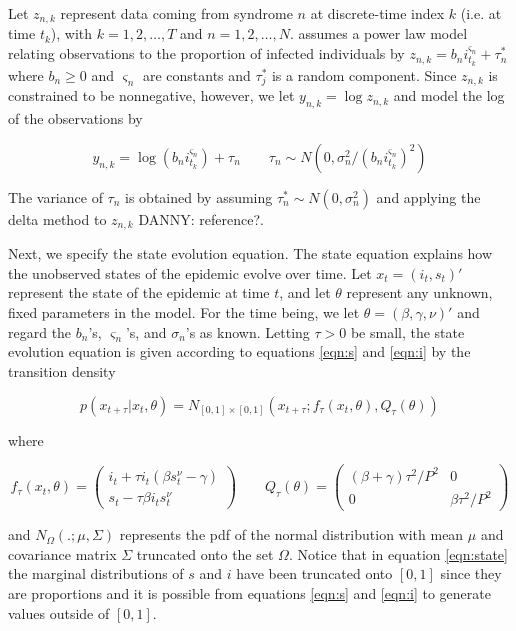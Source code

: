 \documentclass{article}
\newcommand{\danny}[1]{{\color{blue}DANNY: #1}}
\begin{document}
Let $z_{n,k}$ represent data coming from syndrome $n$ at discrete-time index $k$ (i.e. at time $t_k$), with $k = 1,2,\ldots,T$ and $n = 1,2,\ldots,N$.  \citet{skvortsov2012monitoring} assumes a power law model relating observations to the proportion of infected individuals by $z_{n,k} = b_ni_{t_k}^{\varsigma_n} + \tau^*_n$ where $b_n \ge 0$ and $\varsigma_n$ are constants and $\tau^*_j$ is a random component. Since $z_{n,k}$ is constrained to be nonnegative, however, we let $y_{n,k} = \log z_{n,k}$ and model the log of the observations by

\begin{equation}
y_{n,k} = \log \left(b_ni_{t_k}^{\varsigma_n}\right) + \tau_n \qquad \tau_n \sim N\left(0,\sigma_n^2 / (b_ni_{t_k}^{\varsigma_n})^2\right) \label{eqn:obs}
\end{equation}

\noindent The variance of $\tau_n$ is obtained by assuming $\tau^*_n \sim N(0,\sigma_n^2)$ and applying the delta method to $z_{n,k}$ \danny{reference?}.

Next, we specify the state evolution equation.  The state equation explains how the unobserved states of the epidemic evolve over time.  Let $x_t = (i_t,s_t)'$ represent the state of the epidemic at time $t$, and let $\theta$ represent any unknown, fixed parameters in the model.  For the time being, we let $\theta = (\beta, \gamma, \nu)'$ and regard the $b_n$'s, $\varsigma_n$'s, and $\sigma_n$'s as known.  Letting $\tau > 0$ be small, the state evolution equation is given according to equations \eqref{eqn:s} and \eqref{eqn:i} by the transition density

\begin{equation}
p\left(x_{t+\tau}\left|x_t,\theta\right.\right) = N_{[0,1]\times[0,1]}\left(x_{t+\tau};f_\tau(x_t,\theta),Q_{\tau}(\theta)\right) \label{eqn:state}
\end{equation}

\noindent where

\[
f_\tau(x_t,\theta) = \left(
\begin{array}{c}
i_t + \tau i_t(\beta s^{\nu}_t - \gamma) \\
s_t - \tau\beta i_ts^{\nu}_t
\end{array}
\right)
\qquad
Q_\tau(\theta) = \left(
\begin{array}{ccccc}
(\beta + \gamma)\tau^2/P^2 & 0 \\
0 & \beta\tau^2/P^2
\end{array}
\right)
\]

\noindent and $N_{\Omega}(.;\mu,\Sigma)$ represents the pdf of the normal distribution with mean $\mu$ and covariance matrix $\Sigma$ truncated onto the set $\Omega$.  Notice that in equation \eqref{eqn:state} the marginal distributions of $s$ and $i$ have been truncated onto $[0,1]$ since they are proportions and it is possible from equations \eqref{eqn:s} and \eqref{eqn:i} to generate values outside of $[0,1]$.
\end{document}
